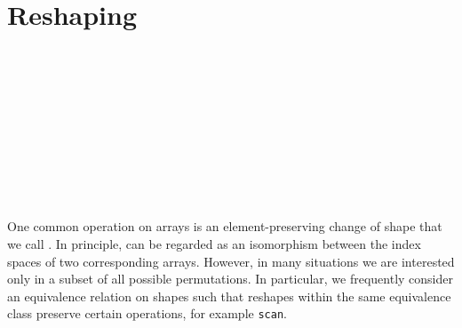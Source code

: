 \section{Reshaping\label{sec:reshaping}}
\begin{code}[hide]%
\>[0]\AgdaSpace{}%
\AgdaSpace{}%
\AgdaSymbol{(}\AgdaSpace{}%
\AgdaSymbol{:}\AgdaSpace{}%
\AgdaSymbol{)}\AgdaSpace{}%
\<%
\\
\>[0][@{}l@{\AgdaIndent{0}}]%
\>[2]\AgdaSpace{}%
\AgdaSpace{}%
\AgdaSymbol{;}\AgdaSpace{}%
\AgdaSpace{}%
\AgdaSpace{}%
\<%
\\
%
\>[2]\AgdaSpace{}%
\<%
\\
\>[2][@{}l@{\AgdaIndent{0}}]%
\>[3]\AgdaSpace{}%
\AgdaSpace{}%
\AgdaSymbol{:}\AgdaSpace{}%
\<%
\\
%
\>[3]\AgdaSpace{}%
\AgdaSpace{}%
\AgdaSpace{}%
\AgdaSpace{}%
\AgdaSymbol{:}\AgdaSpace{}%
\<%
\\
%
\>[3]\AgdaSpace{}%
\AgdaSymbol{:}\AgdaSpace{}%
\<%
\\
%
\\[\AgdaEmptyExtraSkip]%
%
\>[2]\AgdaSpace{}%
\AgdaSpace{}%
\<%
\\
%
\>[2]\AgdaSpace{}%
\AgdaSpace{}%
\<%
\\
%
\>[2]\AgdaSpace{}%
\AgdaSpace{}%
\<%
\end{code}
One common operation on arrays is an element-preserving change of shape that we
call . In principle,  can be regarded as an isomorphism
between the index spaces of two corresponding arrays. However, in many
situations we are interested only in a subset of all possible permutations. In
particular, we frequently consider an equivalence relation on shapes such that
reshapes within the same equivalence class preserve certain operations, for
example \texttt{scan}.

